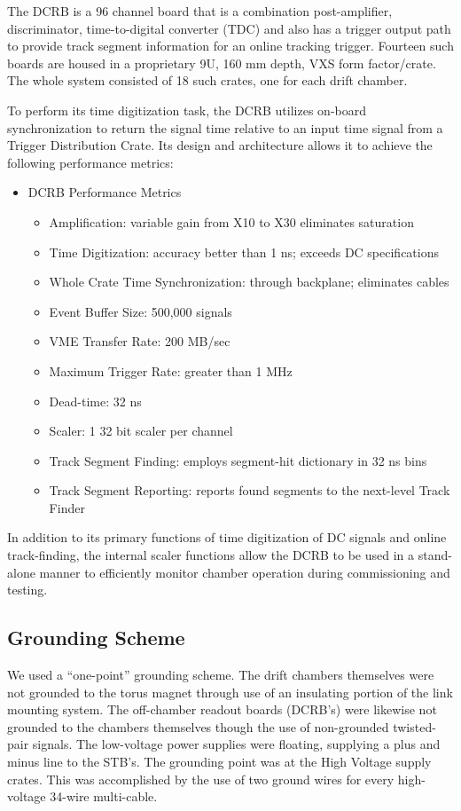 The DCRB is a 96 channel board that is a combination post-amplifier,
discriminator, time-to-digital converter (TDC) and also has a trigger
output path to provide track segment information for an online tracking trigger.
Fourteen such boards are housed in
a proprietary 9U, 160 mm depth, VXS form factor/crate.
The whole system consisted of 18 such crates, one for each drift chamber.

To perform its time digitization task, the DCRB utilizes on-board synchronization to
return the signal time relative to an input time signal from  a Trigger Distribution
Crate.
Its design and architecture
allows it to achieve the following performance metrics:
\begin{itemize}
\item DCRB Performance Metrics
\begin{itemize}
\item Amplification: variable gain from X10 to X30 eliminates saturation
\item Time Digitization: accuracy better than 1 ns; exceeds DC specifications
\item Whole Crate Time Synchronization: through backplane; eliminates cables
\item Event Buffer Size: 500,000 signals
\item VME Transfer Rate: 200 MB/sec
\item Maximum Trigger Rate: greater than 1 MHz
\item Dead-time: 32 ns
\item Scaler: 1 32 bit scaler per channel
\item Track Segment Finding: employs segment-hit dictionary in 32 ns bins
\item Track Segment Reporting: reports found segments to the next-level Track Finder
\end{itemize}
\end{itemize}

In addition to its primary functions of time digitization of DC signals and online
track-finding, the internal scaler functions allow the DCRB to be used in 
a stand-alone manner to efficiently monitor chamber operation during commissioning
and testing.

\subsection{Grounding Scheme}
We used a ``one-point'' grounding scheme.  The drift chambers themselves were not
grounded to the torus magnet through use of an insulating portion of the link
mounting system.  The off-chamber readout boards (DCRB's) were likewise not grounded
to the chambers themselves though the use of non-grounded twisted-pair signals.
The low-voltage power supplies were floating, supplying a plus and minus line 
to the STB's.
The grounding point was at the High Voltage supply crates.  This was accomplished
by the use of two ground wires for every high-voltage 34-wire multi-cable.
